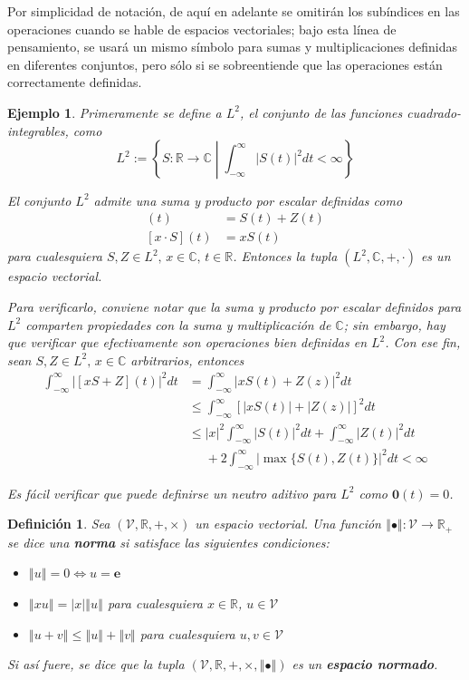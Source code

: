 \documentclass[12pt,letterpaper]{book}
\newtheorem{definicion}{Definición}[chapter]
\newtheorem{ejemplo}{Ejemplo}[chapter]
\newcommand{\R}{\mathbb{R}}
\newcommand{\C}{\mathbb{C}}
\newcommand{\intR}{\int_{-\infty}^{\infty}}
\newcommand{\abso}[1]{\left| #1 \right|}
\newcommand{\norma}[1]{\left\Vert #1 \right\Vert}
\newcommand{\talque}{\mathrel{}\middle|\mathrel{}}
\newcommand{\pheq}{\phantom{=}}
\begin{document}
Por simplicidad de notación, de aquí en adelante se omitirán los subíndices en las operaciones cuando se hable de espacios vectoriales; bajo esta línea de pensamiento, se usará un mismo símbolo para sumas y multiplicaciones definidas en diferentes conjuntos, pero sólo si se sobreentiende que las operaciones están correctamente definidas.

\begin{ejemplo}
Primeramente se define a $L^2$, el conjunto de las funciones cuadrado-integrables, como
\begin{equation}
L^2 := \left\{ S: \R\rightarrow\C \talque \intR \abso{S(t)}^2 dt < \infty \right\}
\end{equation}

El conjunto $L^2$ admite una suma y producto por escalar definidas como
\begin{align}
[S+Z](t) &= S(t) + Z(t) \\
[x\cdot S](t) &= x S(t)
\end{align}
para cualesquiera $S, Z \in L^{2}, \, x\in \C, \, t\in \R$. 
%
Entonces la tupla $(L^{2}, \C,+,\cdot)$ es un espacio vectorial.

Para verificarlo, conviene notar que la suma y producto por escalar definidos para $L^{2}$ comparten propiedades con la suma y multiplicación de $\C$; sin embargo, hay que verificar que efectivamente son operaciones bien definidas en $L^{2}$.
%
Con ese fin, sean $S, Z \in L^{2}, \, x \in \C$ arbitrarios, entonces
\begin{align*}
\intR \abso{\left[x S + Z\right]\left(t\right)}^2 dt 
&= 
\intR \abso{ xS(t) + Z(z)}^2 dt \\
&\leq
\intR \left[ \abso{ xS(t)} + \abso{ Z(z)} \right]^2 dt \\
&\leq
\abso{x}^{2} \intR \abso{ S(t)}^{2} dt + \intR \abso{ Z(t)}^{2} dt \\
&\pheq
+ 2\intR \abso{ \max\{ S(t), Z(t) \} }^{2} dt < \infty
\end{align*}

Es fácil verificar que puede definirse un neutro aditivo para $L^{2}$ como $\boldsymbol{0}(t) = 0$.
\end{ejemplo}

\begin{definicion}
Sea $(\mathcal{V},\R,+,\times)$ un espacio vectorial. Una función $\norma{\bullet}: \mathcal{V}\rightarrow\R_+$ se dice una \textbf{norma} si satisface las siguientes condiciones:
\begin{itemize}
\item $\norma{u} = 0 \Leftrightarrow u = \boldsymbol{e}$
\item $\norma{x u} = \abso{x} \norma{u}$ para cualesquiera $x \in \R$, $u \in \mathcal{V}$
\item $\norma{u+v} \leq \norma{u} + \norma{v}$ para cualesquiera $u, v \in \mathcal{V}$
\end{itemize}
Si así fuere, se dice que la tupla $(\mathcal{V},\R,+,\times, \norma{\bullet})$ es un \textbf{espacio normado}.
\end{definicion}
\end{document}
